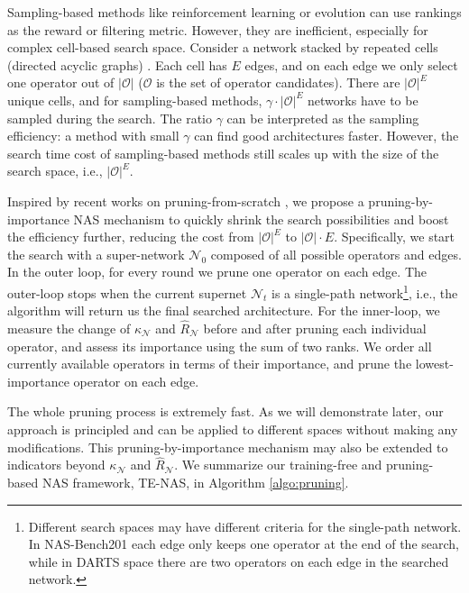 \documentclass{article} \usepackage{iclr2021_conference,times}
\begin{document}
Sampling-based methods like reinforcement learning or evolution can use rankings as the reward or filtering metric. However, they are inefficient, especially for complex cell-based search space. Consider a network stacked by repeated cells (directed acyclic graphs) \citep{zoph2018learning,liu2018darts}. Each cell has $E$ edges, and on each edge we only select one operator out of $|\mathcal{O}|$ ($\mathcal{O}$ is the set of operator candidates). There are $|\mathcal{O}|^E$ unique cells, and for sampling-based methods, $\gamma \cdot |\mathcal{O}|^E$ networks have to be sampled during the search. The ratio $\gamma$ can be interpreted as the sampling efficiency: a method with small $\gamma$ can find good architectures faster. However, the search time cost of sampling-based methods still scales up with the size of the search space, i.e., $|\mathcal{O}|^E$.

Inspired by recent works on pruning-from-scratch \citep{lee2018snip,wang2020picking}, 
we propose a pruning-by-importance NAS mechanism to quickly shrink the search possibilities and boost the efficiency further, reducing the cost from $|\mathcal{O}|^E$ to $|\mathcal{O}| \cdot E$.
Specifically, we start the search with a super-network $\mathcal{N}_0$ composed of all possible operators and edges. In the outer loop, for every round we prune one operator on each edge. The outer-loop stops when the current supernet $\mathcal{N}_t$ is a single-path network\footnote{Different search spaces may have different criteria for the single-path network. In NAS-Bench201 \citep{dong2020bench} each edge only keeps one operator at the end of the search, while in DARTS space \citep{liu2018darts} there are two operators on each edge in the searched network.}, i.e., the algorithm will return us the final searched architecture. For the inner-loop, we measure the change of $\kappa_\mathcal{N}$ and $\hat{R}_\mathcal{N}$ before and after pruning each individual operator, and assess its importance using the sum of two ranks. We order all currently available operators in terms of their importance, and prune the lowest-importance operator on each edge.


The whole pruning process is extremely fast. As we will demonstrate later, our approach is principled and can be applied to different spaces without making any modifications.
This pruning-by-importance mechanism may also be extended to indicators beyond  $\kappa_\mathcal{N}$ and $\hat{R}_\mathcal{N}$.
We summarize our training-free and pruning-based NAS framework, TE-NAS, in Algorithm \ref{algo:pruning}. 
\end{document}
